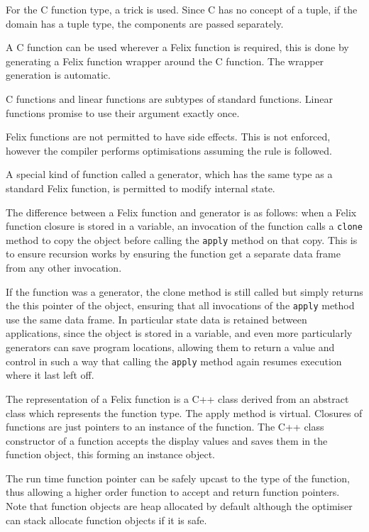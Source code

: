 \documentclass[oneside]{book}
\begin{document}
For the C function type, a trick is used. Since C has no concept of a tuple,
if the domain has a tuple type, the components are passed separately.

A C function can be used wherever a Felix function is required, this is done
by generating a Felix function wrapper around the C function. The wrapper
generation is automatic.

C functions and linear functions are subtypes of standard functions.
Linear functions promise to use their argument exactly once.

Felix functions are not permitted to have side effects. This is not
enforced, however the compiler performs optimisations assuming the rule
is followed.

A special kind of function called a generator, which has the same type
as a standard Felix function, is permitted to modify internal state.

The difference between a Felix function and generator is as follows:
when a Felix function closure is stored in a variable, an invocation of the function
calls a \verb$clone$ method to copy the object before calling the \verb$apply$ method
on that copy. This is to ensure recursion
works by ensuring the function get a separate data frame from any other
invocation.

If the function was a generator, the clone method is still called but simply
returns the this pointer of the object, ensuring that all invocations
of the \verb$apply$ method use the same data frame. In particular state
data is retained between applications, since the object is stored in a variable,
and even more particularly generators can save program locations, allowing them
to return a value and control in such a way that calling the \verb$apply$ method
again resumes execution where it last left off.

The representation of a Felix function is a C++ class derived from an abstract class
which represents the function type. The apply method is virtual. Closures of functions
are just pointers to an instance of the function. The C++ class constructor of a function
accepts the display values and saves them in the function object, this forming
an instance object. 

The run time function pointer can be safely upcast to the type of the function,
thus allowing a higher order function to accept and return function pointers.
Note that function objects are heap allocated by default although the optimiser
can stack allocate function objects if it is safe.
\end{document}
